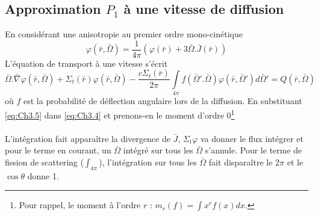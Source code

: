 \subsection{Approximation $P_1$ à une vitesse de diffusion}
En considérant une anisotropie au premier ordre mono-cinétique
\begin{equation}
\varphi (\bar r,\bar \Omega ) = \frac{1}{{4\pi }}(\varphi (\bar r) + 3\bar \Omega .\bar J(\bar r))
\label{eq:Ch3.4}
\end{equation}
L'équation de transport à une vitesse s'écrit 
\begin{equation}
\bar \Omega .\bar \nabla \varphi (\bar r,\bar \Omega ) + {\Sigma _t}(\bar r)\varphi (\bar r,\bar \Omega ) - \frac{{c{\Sigma _t}(\bar r)}}{{2\pi }}\int\limits_{4\pi }   f(\bar \Omega '.\bar \Omega )\varphi (\bar r,\bar \Omega ')d\bar \Omega ' = Q(\bar r,\bar \Omega )
\label{eq:Ch3.5}
\end{equation}
où $f$ est la probabilité de déflection angulaire lors de la diffusion. En substituant 
\eqref{eq:Ch3.5} dans \eqref{eq:Ch3.4} et prenons-en le moment d'ordre 0\footnote{Pour 
rappel, le moment à l'ordre $r$ : $m_r(f) = \int x^r f(x)dx$.}\ \\

\ \\

L'intégration fait apparaître la divergence de $\bar J$, $\Sigma_t\varphi$ va donner le 
flux intégrer et pour le terme en courant, un $\bar{\Omega}$ intégré sur tous les 
$\bar\Omega$ s'annule. Pour le terme de fission de scattering ($\int_{4\pi}$), l'intégration 
sur tous les $\bar\Omega$ fait disparaître le $2\pi$ et le $\cos\theta$ donne 1. \\

